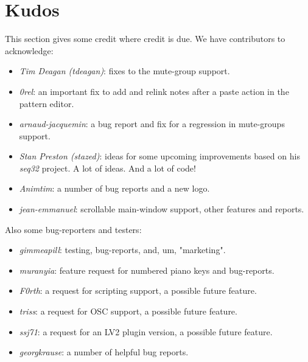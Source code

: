 %
%
%

\section{Kudos}
\label{sec:kudos}

   This section gives some credit where credit is due.
   We have contributors to acknowledge:

   \begin{itemize}
      \item \textsl{Tim Deagan (tdeagan)}:
         fixes to the mute-group support.
      \item \textsl{0rel}:
         an important fix to add and relink notes after a
         paste action in the pattern editor.
      \item \textsl{arnaud-jacquemin}:
         a bug report and fix for a regression in mute-groups support.
      \item \textsl{Stan Preston (stazed)}:
         ideas for some upcoming improvements based
         on his \textsl{seq32} project.  A lot of ideas.
         And a lot of code!
      \item \textsl{Animtim}:
         a number of bug reports and a new logo.
      \item \textsl{jean-emmanuel}:
         scrollable main-window support, other features and reports.
   \end{itemize}

   Also some bug-reporters and testers:

   \begin{itemize}
      \item \textsl{gimmeapill}:
         testing, bug-reports, and, um, "marketing".
      \item \textsl{muranyia}:
         feature request for numbered piano keys and bug-reports.
      \item \textsl{F0rth}:
         a request for scripting support, a possible future feature.
      \item \textsl{triss}:
         a request for OSC support, a possible future feature.
      \item \textsl{ssj71}:
         a request for an LV2 plugin version, a possible future feature.
      \item \textsl{georgkrause}:
         a number of helpful bug reports.
         
   \end{itemize}

